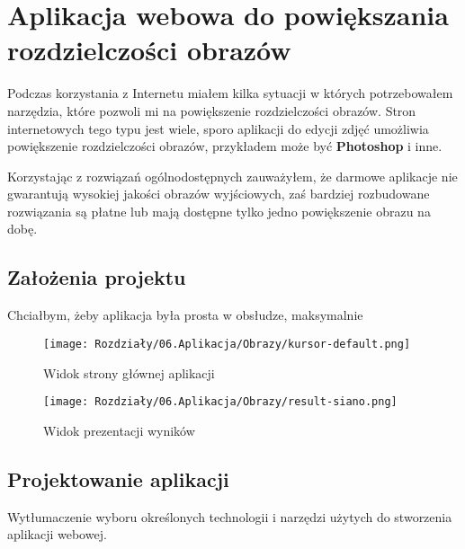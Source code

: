 \chapter{Aplikacja webowa do powiększania rozdzielczości obrazów}

Podczas korzystania z Internetu miałem kilka sytuacji w których potrzebowałem narzędzia, które pozwoli mi na powiększenie rozdzielczości obrazów. Stron internetowych tego typu jest wiele, sporo aplikacji do edycji zdjęć umożliwia powiększenie rozdzielczości obrazów, przykładem może być \textbf{Photoshop} i inne.

Korzystając z rozwiązań ogólnodostępnych zauważyłem, że darmowe aplikacje nie gwarantują wysokiej jakości obrazów wyjściowych, zaś bardziej rozbudowane rozwiązania są płatne lub mają dostępne tylko jedno powiększenie obrazu na dobę. 

\section{Założenia projektu}

Chciałbym, żeby aplikacja była prosta w obsłudze, maksymalnie 


\begin{figure}[ht]
    \centering
    \begin{minipage}[t]{0.99\linewidth}
        \texttt{[image: Rozdziały/06.Aplikacja/Obrazy/kursor-default.png]}  
        \caption{Widok strony głównej aplikacji}
        \label{fig:image80}
    \end{minipage}
\end{figure}


\begin{figure}[ht]
    \centering
    \begin{minipage}[t]{0.99\linewidth}
        \texttt{[image: Rozdziały/06.Aplikacja/Obrazy/result-siano.png]}  
        \caption{Widok prezentacji wyników}
        \label{fig:image81}
    \end{minipage}
\end{figure}




\section{Projektowanie aplikacji}


Wytłumaczenie wyboru określonych technologii i narzędzi użytych do stworzenia aplikacji webowej.




